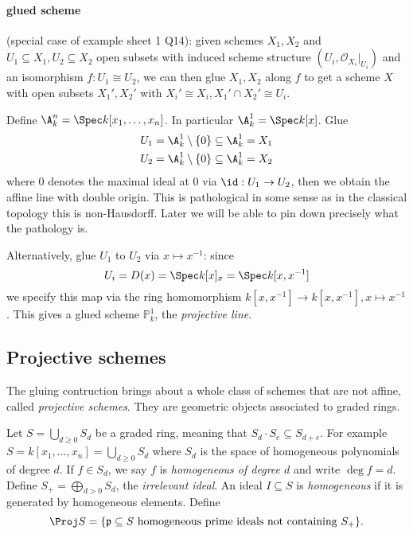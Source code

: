 \documentclass[a4paper]{article}
\renewcommand*{\P}{\mathbb{P}}
\newcommand{\sh}[1]{\mathcal{#1}} %
\begin{document}
\paragraph{glued scheme}

(special case of example sheet 1 Q14): given schemes \(X_1, X_2\) and \(U_1 \subseteq X_1, U_2 \subseteq X_2\) open subsets with induced scheme structure \((U_i, \sh O_{X_i}|_{U_i})\) and an isomorphism \(f: U_1 \cong U_2\), we can then glue \(X_1, X_2\) along \(f\) to get a scheme \(X\) with open subsets \(X_1', X_2'\) with \(X_i' \cong X_i, X_1' \cap X_2' \cong U_i\).

\begin{eg}
  Define \(\A_k^n = \Spec k[x_1, \dots, x_n]\). In particular \(\A_k^1 = \Spec k[x]\). Glue
  \begin{align*}
    U_1 &= \A_k^1 \setminus \{0\} \subseteq \A_k^1 = X_1 \\
    U_2 &= \A_k^1 \setminus \{0\} \subseteq \A_k^1 = X_2
  \end{align*}
  where \(0\) denotes the maximal ideal at \(0\) via \(\id: U_1 \to U_2\), then we obtain the affine line with double origin. This is pathological in some sense as in the classical topology this is non-Hausdorff. Later we will be able to pin down precisely what the pathology is.

  Alternatively, glue \(U_1\) to \(U_2\) via \(x \mapsto x^{-1}\): since
  \[
    U_i = D(x) = \Spec k[x]_x = \Spec k[x, x^{-1}]
  \]
  we specify this map via the ring homomorphism \(k[x, x^{-1}] \to k[x, x^{-1}], x \mapsto x^{-1}\). This gives a glued scheme \(\P_k^1\), the \emph{projective line}.
\end{eg}

\subsection{Projective schemes}

The gluing contruction brings about a whole class of schemes that are not affine, called \emph{projective schemes}. They are geometric objects associated to graded rings.

Let \(S = \bigcup_{d \geq 0} S_d\) be a graded ring, meaning that \(S_d \cdot S_e \subseteq S_{d + e}\). For example \(S = k[x_1, \dots, x_n] = \bigcup_{d \geq 0} S_d\) where \(S_d\) is the space of homogeneous polynomials of degree \(d\). If \(f \in S_d\), we say \(f\) is \emph{homogeneous of degree \(d\)} and write \(\deg f = d\). Define \(S_+ = \bigoplus_{d > 0} S_d\), the \emph{irrelevant ideal}. An ideal \(I \subseteq S\) is \emph{homogeneous} if it is generated by homogeneous elements. Define
\[
  \Proj S = \{\mathfrak p \subseteq S \text{ homogeneous prime ideals not containing } S_+\}.
\]
\end{document}
